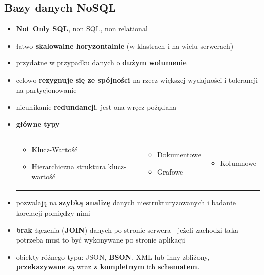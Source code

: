\documentclass[a4paper]{article}
\begin{document}
    \subsection{Bazy danych NoSQL}
    \begin{itemize}
        \item \textbf{Not Only SQL}, non SQL, non relational
        \item łatwo \textbf{skalowalne horyzontalnie} (w klastrach i na wielu serwerach)
        \item przydatne w przypadku danych o \textbf{dużym wolumenie}
        \item celowo \textbf{rezygnuje się ze spójności} na rzecz większej wydajności i tolerancji na partycjonowanie
        \item nieunikanie \textbf{redundancji}, jest ona wręcz pożądana
        \item \textbf{główne typy}
        \begin{table}[H]
            \begin{center}
                \begin{tabular}{p{7cm} p{4cm} p{5cm}}
                    \begin{itemize}
                        \item Klucz-Wartość
                        \item Hierarchiczna struktura klucz-wartość
                    \end{itemize}
                    &
                    \begin{itemize}
                        \item Dokumentowe
                        \item Grafowe
                    \end{itemize}
                    &
                    \begin{itemize}
                        \item Kolumnowe
                    \end{itemize}
                \end{tabular}
            \end{center}
        \end{table}
        \item pozwalają na \textbf{szybką analizę} danych niestrukturyzowanych i badanie korelacji pomiędzy nimi
        \item \textbf{brak} łączenia (\textbf{JOIN}) danych po stronie serwera - jeżeli zachodzi taka potrzeba musi to być wykonywane po stronie aplikacji
        \item obiekty różnego typu: JSON, \textbf{BSON}, XML lub inny zbliżony, \textbf{przekazywane} są wraz \textbf{z
        kompletnym} ich \textbf{schematem}.
    \end{itemize}
\end{document}
